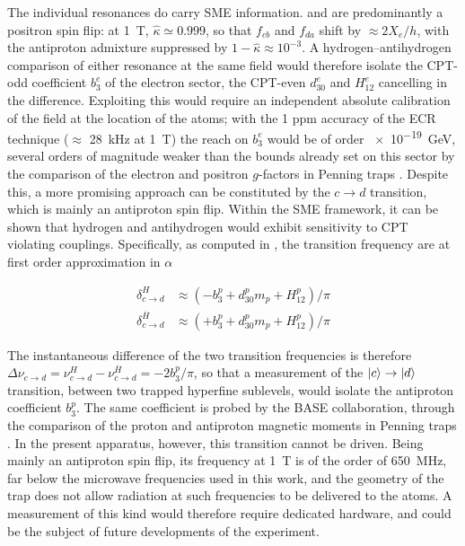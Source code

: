 The individual resonances do carry SME information. \fcb and \fda are predominantly a positron spin flip: at \SI{1}{\tesla}, $\hat\kappa \simeq 0.999$, so that $f_{cb}$ and $f_{da}$ shift by $\approx 2X_e/h$, with the antiproton admixture suppressed by $1-\hat\kappa \approx 10^{-3}$. A hydrogen--antihydrogen comparison of either resonance at the same field would therefore isolate the CPT-odd coefficient $b^e_3$ of the electron sector, the CPT-even $d^e_{30}$ and $H^e_{12}$ cancelling in the difference. Exploiting this would require an independent absolute calibration of the field at the location of the atoms; with the 1 ppm accuracy of the ECR technique ($\approx$ \SI{28}{\kilo \hertz} at \SI{1}{\tesla}) the reach on $b^e_3$ would be of order \SI{e-19}{\giga \electronvolt}, several orders of magnitude weaker than the bounds already set on this sector by the comparison of the electron and positron $g$-factors in Penning traps \cite{VanDyck:1987ay}. Despite this, a more promising approach can be constituted by the $c \rightarrow d$ transition, which is mainly an antiproton spin flip. Within the SME framework, it can be shown that hydrogen and antihydrogen would exhibit sensitivity to CPT violating couplings. Specifically, as computed in \cite{Bluhm_1999,Kostelecky:2015nma}, the transition frequency are at first order approximation in $\alpha$

\begin{align}
\delta^{H}_{c \rightarrow d} &\approx ( - b_{3}^{p} + d_{30}^{p} m_{p} + H_{12}^{p}) / \pi \\
\delta^{\overline{H}}_{c \rightarrow d} &\approx ( + b_{3}^{p} + d_{30}^{p} m_{p} + H_{12}^{p}) / \pi
\end{align}

The instantaneous difference of the two transition frequencies is therefore $\Delta \nu_{c \rightarrow d} = \nu^{H}_{c \rightarrow d} - \nu^{\overline{H}}_{c \rightarrow d} = - 2 b_{3}^{p}/ \pi$, so that a measurement of the $\ket{c} \rightarrow \ket{d}$ transition, between two trapped hyperfine sublevels, would isolate the antiproton coefficient $b^{p}_{3}$. The same coefficient is probed by the BASE collaboration, through the comparison of the proton and antiproton magnetic moments in Penning traps \cite{Smorra2017}.
In the present apparatus, however, this transition cannot be driven. Being mainly an antiproton spin flip, its frequency at \SI{1}{\tesla} is of the order of \SI{650}{\mega\hertz}, far below the microwave frequencies used in this work, and the geometry of the trap does not allow radiation at such frequencies to be delivered to the atoms. A measurement of this kind would therefore require dedicated hardware, and could be the subject of future developments of the experiment.

